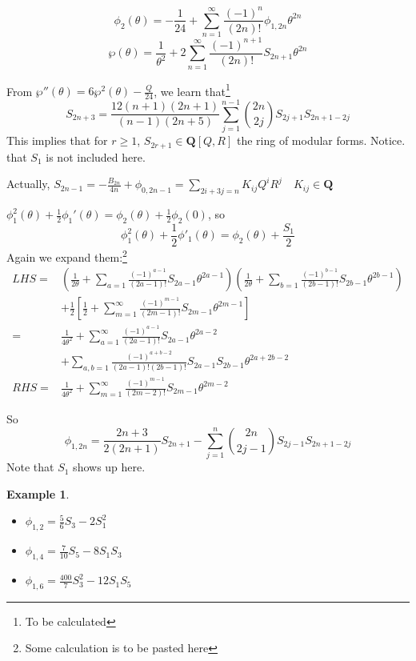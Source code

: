 \documentclass{article}
\newtheorem{Eg}{Example}[section]
\begin{document}
\begin{equation}
\phi_2(\theta) = - \frac{1}{24} + \sum\limits_{n=1}^{\infty} \frac{(-1)^n}{(2n)!}\phi_{1,2n}\theta^{2n}
\end{equation}
\begin{equation}
\wp(\theta) = \frac{1}{\theta^2} + 2 \sum\limits_{n=1}^{\infty} \frac{(-1)^{n+1}}{(2n)!}S_{2n+1}\theta^{2n}
\end{equation}

From $\wp''(\theta) = 6\wp^2(\theta) - \frac{Q}{24}$, we learn that\footnote{To be calculated}
\begin{equation}
S_{2n+3} = \frac{12(n+1)(2n+1)}{(n-1)(2n+5)} \sum\limits_{j=1}^{n-1} \binom{2n}{2j}S_{2j+1}S_{2n+1-2j}
\end{equation}
This implies that for $r\geq 1$, $S_{2r+1}\in \bm{Q}[Q,R]$ the ring of modular forms. Notice. that $S_1$ is not included here.

Actually, $S_{2n-1} = -\frac{B_{2n}}{4n} + \phi_{0,2n-1} = \sum\limits_{2i+3j=n}^{}K_{ij}Q^iR^j \quad K_{ij}\in \bm{Q}$

$\phi_1^2(\theta) + \frac{1}{2}\phi_1'(\theta) = \phi_2(\theta) + \frac{1}{2}\phi_2(0)$, so
\begin{equation}
\phi_1^2(\theta)+ \frac{1}{2}\phi'_1(\theta) = \phi_2(\theta) + \frac{S_1}{2}
\end{equation}
Again we expand them:\footnote{Some calculation is to be pasted here}
\begin{align*}
 LHS = &(\frac{1}{2\theta} + \sum\limits_{a=1}^{} \frac{(-1)^{a-1}}{(2a-1)!}S_{2a-1}\theta^{2a-1})(\frac{1}{2\theta} + \sum\limits_{b=1}^{} \frac{(-1)^{b-1}}{(2b-1)!} S_{2b-1}\theta^{2b-1})\\
       &+ \frac{1}{2} \left[ \frac{1}{2} + \sum\limits_{m=1}^{\infty} \frac{(-1)^{m-1}}{(2m-1)!}S_{2m-1}\theta^{2m-1} \right]\\
     = & \frac{1}{4\theta^2} + \sum\limits_{a=1}^{\infty} \frac{(-1)^{a-1}}{(2a-1)!}S_{2a-1}\theta^{2a-2} \\
       &+ \sum\limits_{a,b=1}^{}\frac{(-1)^{a+b-2}}{(2a-1)!(2b-1)!}S_{2a-1}S_{2b-1}\theta^{2a+2b-2}\\ %
RHS  =  & \frac{1}{4\theta^2} + \sum\limits_{m=1}^{\infty} \frac{(-1)^{m-1}}{(2m-2)!} S_{2m-1}\theta^{2m-2}
\end{align*}

So
\begin{equation}
\phi_{1,2n} = \frac{2n+3}{2(2n+1)} S_{2n+1} - \sum\limits_{j=1}^n \binom{2n}{2j-1}S_{2j-1}S_{2n+1-2j}
\end{equation}
Note that $S_1$ shows up here.
\begin{Eg}
  
\begin{itemize}
\item $\phi_{1,2} = \frac{5}{6}S_3 - 2S_1^2$
\item $\phi_{1,4} = \frac{7}{10}S_5 - 8 S_1S_3$
\item $\phi_{1,6} = \frac{400}{7}S_3^2 - 12 S_1S_5$
\end{itemize}
\end{Eg}
\end{document}
